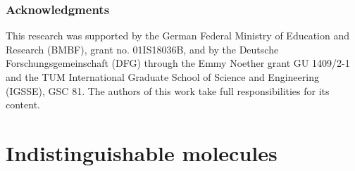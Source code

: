 \documentclass{article} \usepackage{iclr2020_conference,times}
\begin{document}
\subsubsection*{Acknowledgments}

This research was supported by the German Federal Ministry of Education and Research (BMBF), grant no. 01IS18036B, and by the Deutsche Forschungsgemeinschaft (DFG) through the Emmy Noether grant GU 1409/2-1 and the TUM International Graduate School of Science and Engineering (IGSSE), GSC 81. The authors of this work take full responsibilities for its content.




\newpage

\appendix
\section{Indistinguishable molecules}
\end{document}
